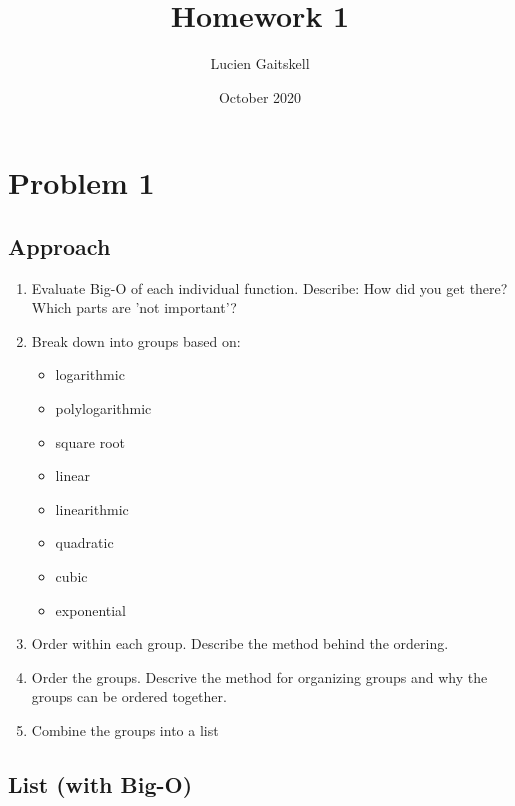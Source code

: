 \documentclass{article}
\title{Homework 1}
\author{Lucien Gaitskell}
\date{October 2020}
\begin{document}
\maketitle

\section{Problem 1}
\subsection{Approach}

\begin{enumerate}
    \item Evaluate Big-O of each individual function. Describe: How did you get there? Which parts are 'not important'?
    \item Break down into groups based on:
    \begin{itemize}
        \item logarithmic
        \item polylogarithmic
        \item square root
        \item linear
        \item linearithmic
        \item quadratic
        \item cubic
        \item exponential
    \end{itemize}
    \item Order within each group. Describe the method behind the ordering.
    \item Order the groups. Descrive the method for organizing groups and why the groups can be ordered together.
    \item Combine the groups into a list
\end{enumerate}

\subsection{List (with Big-O)}
\end{document}
